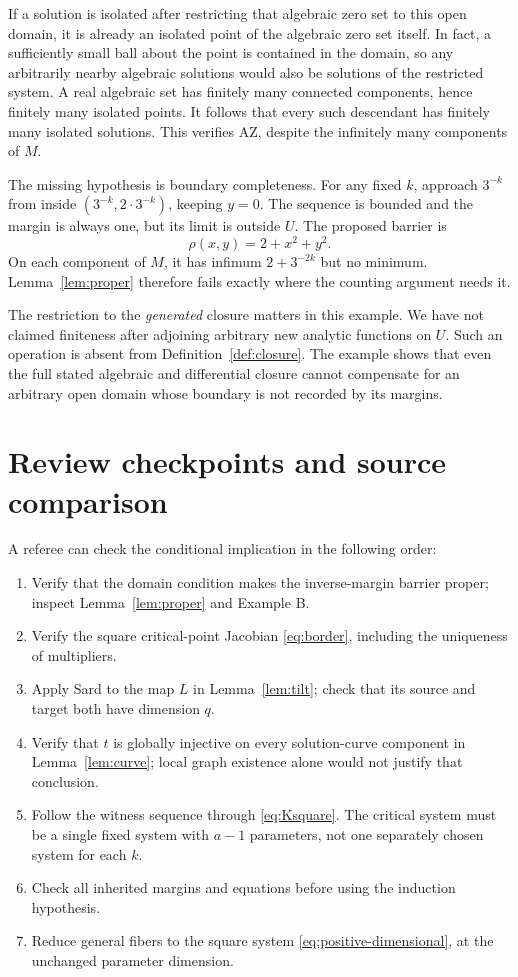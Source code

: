 \documentclass[11pt]{article}
\theoremstyle{definition}
\theoremstyle{remark}
\newcommand{\AZ}{\mathrm{AZ}}
\begin{document}
If a solution is isolated after restricting that algebraic zero
set to this open domain, it is already an isolated point of the
algebraic zero set itself. In fact, a sufficiently small ball
about the point is contained in the domain, so any arbitrarily
nearby algebraic solutions would also be solutions of the
restricted system. A real algebraic set has finitely many
connected components, hence finitely many isolated points.
It follows that every such descendant has finitely many isolated
solutions. This verifies \(\AZ\), despite the infinitely many
components of \(M\).

The missing hypothesis is boundary completeness. For any fixed
\(k\), approach \(3^{-k}\) from inside
\((3^{-k},2\cdot3^{-k})\), keeping \(y=0\). The sequence is bounded
and the margin is always one, but its limit is outside \(U\).
The proposed barrier is
\[
 \rho(x,y)=2+x^2+y^2.
\]
On each component of \(M\), it has infimum \(2+3^{-2k}\) but no
minimum. Lemma~\ref{lem:proper} therefore fails exactly where the
counting argument needs it.

The restriction to the \emph{generated} closure matters in this
example. We have not claimed finiteness after adjoining arbitrary
new analytic functions on \(U\). Such an operation is absent from
Definition~\ref{def:closure}. The example shows that even the full
stated algebraic and differential closure cannot compensate for
an arbitrary open domain whose boundary is not recorded by its
margins.

\section{Review checkpoints and source comparison}
\label{sec:review}

A referee can check the conditional implication in the following
order:
\begin{enumerate}[leftmargin=*]
\item Verify that the domain condition makes the inverse-margin
barrier proper; inspect Lemma~\ref{lem:proper} and Example B.
\item Verify the square critical-point Jacobian
\eqref{eq:border}, including the uniqueness of multipliers.
\item Apply Sard to the map \(L\) in Lemma~\ref{lem:tilt}; check
that its source and target both have dimension \(q\).
\item Verify that \(t\) is globally injective on every solution-curve
component in Lemma~\ref{lem:curve}; local graph existence alone
would not justify that conclusion.
\item Follow the witness sequence through \eqref{eq:Ksquare}.
The critical system must be a single fixed system with \(a-1\)
parameters, not one separately chosen system for each \(k\).
\item Check all inherited margins and equations before using the
induction hypothesis.
\item Reduce general fibers to the square system
\eqref{eq:positive-dimensional}, at the unchanged parameter
dimension.
\end{enumerate}
\end{document}
